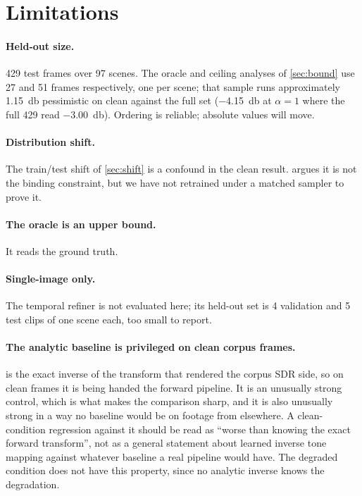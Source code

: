 \section{Limitations}
\label{sec:limitations}

\paragraph{Held-out size.} 429 test frames over 97 scenes. The oracle and
ceiling analyses of \cref{sec:bound} use 27 and 51 frames respectively, one per
scene; that sample runs approximately \SI{1.15}{\decibel} pessimistic on clean
against the full set (\SI{-4.15}{\decibel} at $\alpha = 1$ where the full 429
read \SI{-3.00}{\decibel}). Ordering is reliable; absolute values will move.

\paragraph{Distribution shift.} The train/test shift of \cref{sec:shift} is a
confound in the clean result.  argues it is not the binding
constraint, but we have not retrained under a matched sampler to prove it.

\paragraph{The oracle is an upper bound.} It reads the ground truth.

\paragraph{Single-image only.} The temporal refiner is not evaluated here; its
held-out set is 4 validation and 5 test clips of one scene each, too small to
report.

\paragraph{The analytic baseline is privileged on clean corpus frames.}
 is the exact inverse of the transform that rendered the
corpus SDR side, so on clean frames it is being handed the forward pipeline. It
is an unusually strong control, which is what makes the comparison sharp, and it
is also unusually strong in a way no baseline would be on footage from elsewhere.
A clean-condition regression against it should be read as ``worse than knowing
the exact forward transform'', not as a general statement about learned inverse
tone mapping against whatever baseline a real pipeline would have. The degraded
condition does not have this property, since no analytic inverse knows the
degradation.

